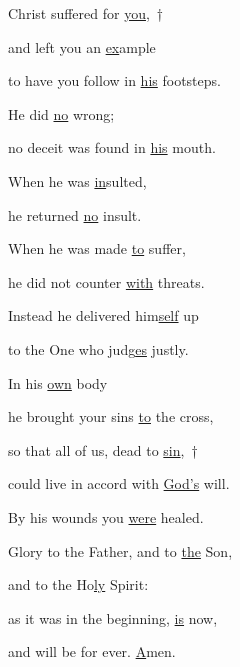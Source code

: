 \noindent Christ suffered for \uline{you},~†~\nopagebreak

and left you an \uline{ex}ample ~\GreStar{}~\nopagebreak

to have you follow in \uline{his} footsteps.

\noindent He did \uline{no} wrong; ~\GreStar{}~\nopagebreak

no deceit was found in \uline{his} mouth.

\noindent When he was \uline{in}sulted, ~\GreStar{}~\nopagebreak

he returned \uline{no} insult.

\noindent When he was made \uline{to} suffer, ~\GreStar{}~\nopagebreak

he did not counter \uline{with} threats.

\noindent Instead he delivered him\uline{self} up ~\GreStar{}~\nopagebreak

to the One who judg\uline{es} justly.

\noindent In his \uline{own} body ~\GreStar{}~\nopagebreak

he brought your sins \uline{to} the cross,

\noindent so that all of us, dead to \uline{sin},~†~\nopagebreak

could live in accord with \uline{God’s} will. ~\GreStar{}~\nopagebreak

By his wounds you \uline{were} healed.

\noindent Glory to the Father, and to \uline{the} Son,~\GreStar{}~\nopagebreak

and to the Ho\uline{ly} Spirit:

\noindent as it was in the beginning, \uline{is} now,~\GreStar{}~\nopagebreak

and will be for ever. \uline{A}men.
